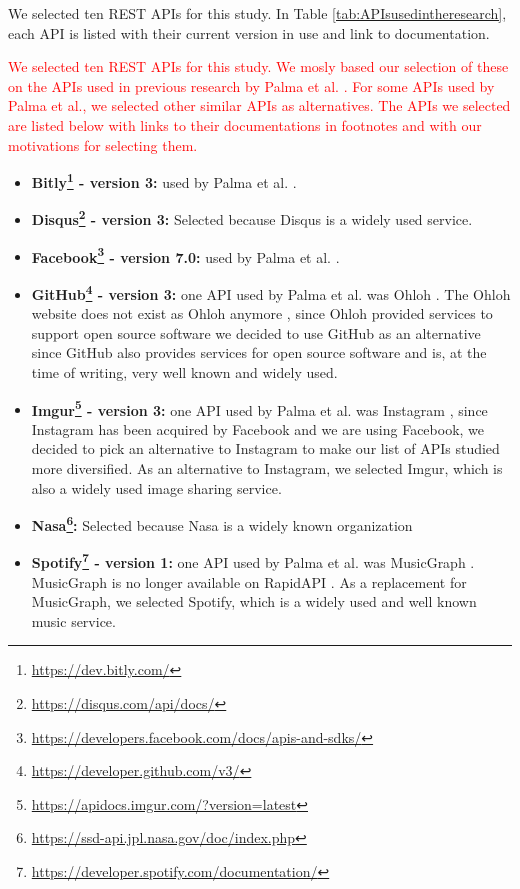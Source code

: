 We selected ten REST APIs for this study. In Table \ref{tab:APIsusedintheresearch}, each API is listed with their current version in use and link to documentation.

\textcolor{red}{
We selected ten REST APIs for this study. We mosly based our selection of these on the APIs used in previous research by Palma et al. \cite{linguistic}. For some APIs used by Palma et al., we selected other similar APIs as alternatives. The APIs we selected are listed below with links to their documentations in footnotes and with our motivations for selecting them. 
}

\begin{itemize}
    \item \textbf{Bitly\footnote{\url{https://dev.bitly.com/}} - version 3:} used by Palma et al. \cite{linguistic}.
    \item \textbf{Disqus\footnote{\url{https://disqus.com/api/docs/}} - version 3:} Selected because Disqus  is  a  widely used service.
    \item \textbf{Facebook\footnote{\url{https://developers.facebook.com/docs/apis-and-sdks/}} - version 7.0:} used by Palma et al. \cite{linguistic}.
    \item \textbf{GitHub\footnote{\url{https://developer.github.com/v3/}} - version 3:} one API used by Palma et al. was Ohloh \cite{linguistic}. The Ohloh website does not exist as Ohloh anymore \cite{ohloh}, since Ohloh provided services to support open source software \cite{ohloh} we decided to use GitHub as an alternative since GitHub also provides services for open source software and is, at the time of writing, very well known and widely used. 
    \item \textbf{Imgur\footnote{\url{https://apidocs.imgur.com/?version=latest}} - version 3:} one API used by Palma et al. was Instagram \cite{linguistic}, since Instagram has been acquired by Facebook and we are using Facebook, we decided to pick an alternative to Instagram to make our list of APIs studied more diversified. As an alternative to Instagram, we selected Imgur, which is also a widely used image sharing service.
    \item \textbf{Nasa\footnote{\url{https://ssd-api.jpl.nasa.gov/doc/index.php}}:} Selected because Nasa is a widely known organization
    \item \textbf{Spotify\footnote{\url{https://developer.spotify.com/documentation/}} - version 1:} one API used by Palma et al. was MusicGraph \cite{linguistic}. MusicGraph is no longer available on RapidAPI \cite{musicrapid}. As a replacement for MusicGraph, we selected Spotify, which is a widely used and well known music service. 

\end{itemize}

